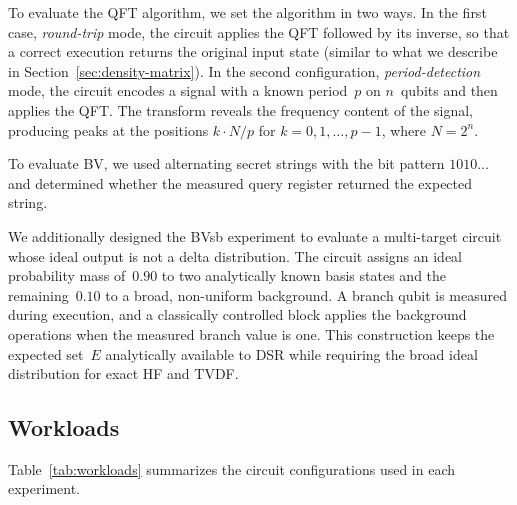 \documentclass[pdflatex,sn-mathphys-num]{sn-jnl}
\theoremstyle{thmstyleone}%
\theoremstyle{thmstyletwo}%
\theoremstyle{thmstylethree}%
\begin{document}
To evaluate the QFT algorithm, we set the algorithm in two ways. In the first case, \emph{round-trip} mode, the circuit applies the QFT followed by its inverse, so that a correct execution returns the original input state (similar to what we describe in Section~\ref{sec:density-matrix}). In the second configuration, \emph{period-detection} mode, the circuit encodes a signal with a known period~$p$ on $n$~qubits and then applies the QFT. The transform reveals the frequency content of the signal, producing peaks at the positions $k \cdot N/p$ for $k = 0, 1, \ldots, p{-}1$, where $N = 2^n$.

To evaluate BV, we used alternating secret strings with the bit pattern $1010\ldots$ and determined whether the measured query register returned the expected string.

We additionally designed the BVsb experiment to evaluate a multi-target circuit whose ideal output is not a delta distribution. The circuit assigns an ideal probability mass of~$0.90$ to two analytically known basis states and the remaining~$0.10$ to a broad, non-uniform background. A branch qubit is measured during execution, and a classically controlled block applies the background operations when the measured branch value is one. This construction keeps the expected set~$E$ analytically available to DSR while requiring the broad ideal distribution for exact HF and TVDF.

\subsection{Workloads}

Table~\ref{tab:workloads} summarizes the circuit configurations used in each experiment.
\end{document}
